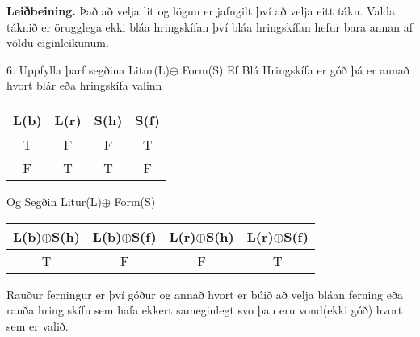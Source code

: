 \documentclass[12pt]{article}
\begin{document}
  {\bf Leiðbeining.}  Það að velja lit og lögun er jafngilt því að velja eitt tákn.  Valda táknið er örugglega ekki bláa hringskífan því bláa hringskífan hefur bara annan af völdu eiginleikunum.

6. Uppfylla þarf segðina Litur(L)$\oplus$ Form(S)
\newline Ef Blá Hringskífa er góð þá er annað  hvort blár eða hringskífa valinn

\begin{center}
    \begin{tabular}{||c c c c||} 
     \hline
     L(b) & L(r) & S(h) & S(f) \\ [0.5ex] 
     \hline\hline
     T & F & F & T \\ 
     \hline 
     \hline
     F & T & T & F \\ 
     \hline 
     
    \end{tabular}
    \end{center}

Og Segðin Litur(L)$\oplus$ Form(S)
\newline
\begin{center}
    \begin{tabular}{||c c c c||} 
	\hline
	L(b)$\oplus$S(h) & L(b)$\oplus$S(f) & L(r)$\oplus$S(h) & L(r)$\oplus$S(f) \\ [0.5ex] 
	\hline\hline
	T & F & F & T \\ 

	\hline 
	\hline
\end{tabular}
\end{center}
Rauður ferningur er því góður og annað hvort er búið að velja bláan ferning eða rauða hring skífu sem hafa ekkert sameginlegt svo þau eru vond(ekki góð) hvort sem er valið.


\end{document}
